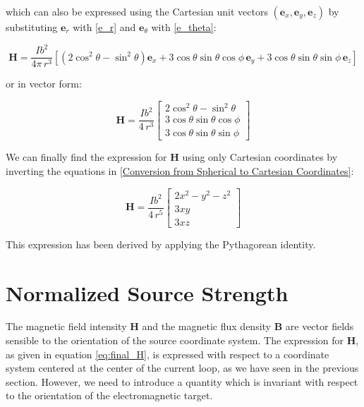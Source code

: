 which can also be expressed using the Cartesian unit 
vectors \((\mathbf{e}_x, \mathbf{e}_y, \mathbf{e}_z)\) 
by substituting \(\mathbf{e}_r\) with \ref{e_r} and 
\(\mathbf{e}_\theta\) with \ref{e_theta}:

\[
    \mathbf{H} = \frac{I b^2}{4 \pi \, r^3} \left[ 
    (2\cos^2\theta - \sin^2\theta) \mathbf{e}_x 
    + 3\cos\theta \sin\theta \cos\phi \, \mathbf{e}_y 
    + 3\cos\theta \sin\theta \sin\phi \, \mathbf{e}_z \right]
\]

or in vector form:

\[
    \mathbf{H} = \frac{I b^2}{4 \, r^3} 
    \begin{bmatrix}
        2\cos^2\theta - \sin^2\theta \\
        3\cos\theta \sin\theta \cos\phi \\
        3\cos\theta \sin\theta \sin\phi
    \end{bmatrix}
\]

We can finally find the expression for $\mathbf{H}$ 
using only Cartesian coordinates by inverting the 
equations in \ref{Conversion from Spherical to 
Cartesian Coordinates}:

\begin{equation}
    \mathbf{H} = \frac{I b^2}{4 \, r^5} 
    \begin{bmatrix}
        2x^2 - y^2 - z^2 \\
        3xy \\
        3xz
    \end{bmatrix}
\label{eq:final_H}
\end{equation}

This expression has been derived by applying the Pythagorean identity.

\section{Normalized Source Strength}
The magnetic field intensity $\mathbf{H}$ and the magnetic flux density $\mathbf{B}$ are vector fields 
sensible to the orientation of the source coordinate system. 
The expression for $\mathbf{H}$, as given in equation \ref{eq:final_H}, is expressed with respect to a 
coordinate system centered at the center of the current loop, as we have seen in the previous section.
However, we need to introduce a quantity which is invariant with
respect to the orientation of the electromagnetic target.

